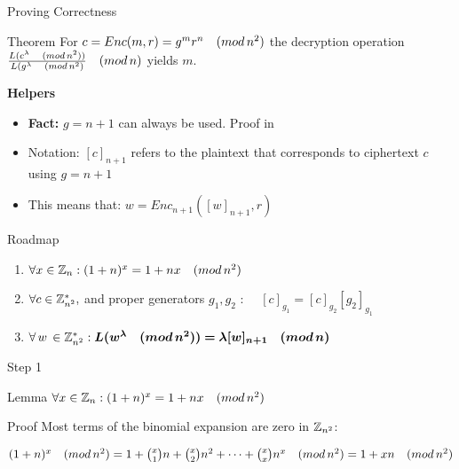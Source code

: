 \documentclass{beamer}
\begin{document}
\begin{frame}[allowframebreaks]{Proving Correctness}

\begin{block}{Theorem}
For $c = Enc(m,r) = g^m  r^n \quad (mod \, {n^2})$ the decryption operation $ \frac{L(c^\lambda \quad (mod \, {n^2}))}{L(g^\lambda \quad (mod \, {n^2})} \quad (mod \, {n})$ yields $m$.
\end{block}

\textbf{Helpers}

\begin{itemize}
\item \textbf{Fact:}  $g=n+1$ can always be used. Proof in \cite{Damgard2001}
\item Notation: $[c]_{n+1}$ refers to the plaintext that corresponds to ciphertext $c$ using $g=n+1$
\item This means that: $w=Enc_{n+1}([w]_{n+1},r)$
\end{itemize}

\begin{block}{Roadmap}
\begin{enumerate}
\item $ \forall x \in \mathbb{Z}_{n} : (1+n)^x = 1 + n  x  \quad (mod \, {n^2}) $ 
\item $ \forall c \in \mathbb{Z}_{n^2}^*, $ and proper generators $g_1,g_2$   : $\quad [c]_{g_1} = [c]_{g_2}  [g_2]_{g_1} $
\item $ \forall \, w \, \in \mathbb{Z}_{n^2}^*:  \bm{L(w^\lambda \quad (mod \, {n^2})) = \lambda [w]_{n+1} \quad (mod \, {n})}$ 
\end{enumerate}
\end{block}
\end{frame}


\begin{frame}{Step 1}
\begin{block}{Lemma}
 $ \forall x \in \mathbb{Z}_{n} : (1+n)^x = 1 + n  x  \quad (mod \, {n^2}) $
\end{block}

\begin{block}{Proof}
Most terms of the binomial expansion are zero in $\mathbb{Z}_{n^2}$:
 
$(1+n)^x \quad (mod \, {n^2}) = 1 + {x \choose  1}  n + {x \choose  2}  n^2 + \cdots  + {x \choose  x}n^x  \quad (mod \, {n^2}) = 1 + x  n	\quad (mod \, {n^2})$

\end{block}

\end{frame}
\end{document}

